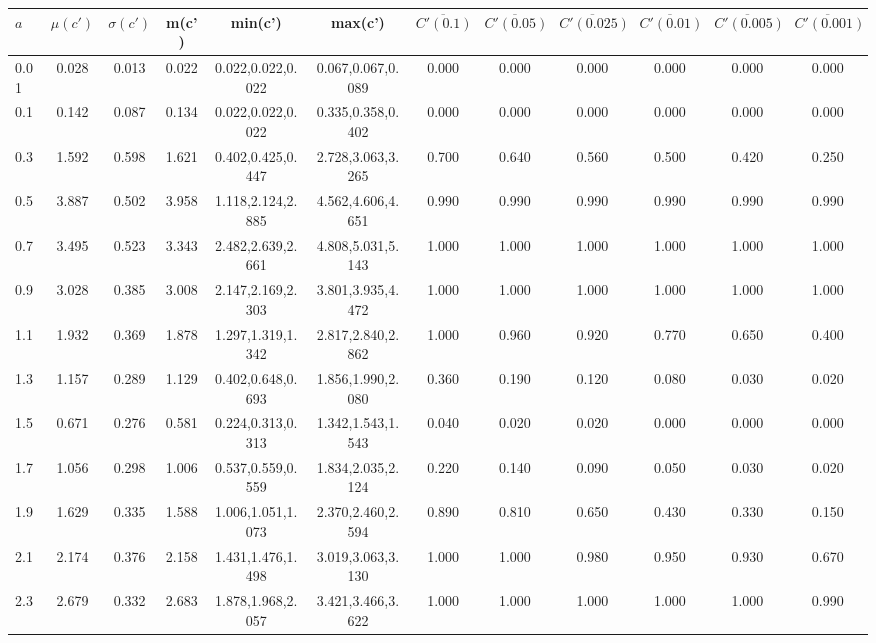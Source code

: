\begin{table*}[h!]
\begin{center}
\begin{tabular}{| l | c | c | c | c | c | c | c | c | c | c | c |}\hline
$a$ & $\mu(c')$ & $\sigma(c')$ & m(c') & min(c') & max(c') & $\overline{C'(0.1)}$ & $\overline{C'(0.05)}$ & $\overline{C'(0.025)}$ & $\overline{C'(0.01)}$ & $\overline{C'(0.005)}$ & $\overline{C'(0.001)}$ \\\hline
0.01 & 0.028 & 0.013 & 0.022 & 0.022,0.022,0.022 & 0.067,0.067,0.089  & 0.000  & 0.000  & 0.000  & 0.000  & 0.000  & 0.000 \\\hline
0.1 & 0.142 & 0.087 & 0.134 & 0.022,0.022,0.022 & 0.335,0.358,0.402  & 0.000  & 0.000  & 0.000  & 0.000  & 0.000  & 0.000 \\\hline
0.3 & 1.592 & 0.598 & 1.621 & 0.402,0.425,0.447 & 2.728,3.063,3.265  & 0.700  & 0.640  & 0.560  & 0.500  & 0.420  & 0.250 \\\hline
0.5 & 3.887 & 0.502 & 3.958 & 1.118,2.124,2.885 & 4.562,4.606,4.651  & 0.990  & 0.990  & 0.990  & 0.990  & 0.990  & 0.990 \\\hline
0.7 & 3.495 & 0.523 & 3.343 & 2.482,2.639,2.661 & 4.808,5.031,5.143  & 1.000  & 1.000  & 1.000  & 1.000  & 1.000  & 1.000 \\\hline
0.9 & 3.028 & 0.385 & 3.008 & 2.147,2.169,2.303 & 3.801,3.935,4.472  & 1.000  & 1.000  & 1.000  & 1.000  & 1.000  & 1.000 \\\hline
1.1 & 1.932 & 0.369 & 1.878 & 1.297,1.319,1.342 & 2.817,2.840,2.862  & 1.000  & 0.960  & 0.920  & 0.770  & 0.650  & 0.400 \\\hline
1.3 & 1.157 & 0.289 & 1.129 & 0.402,0.648,0.693 & 1.856,1.990,2.080  & 0.360  & 0.190  & 0.120  & 0.080  & 0.030  & 0.020 \\\hline
1.5 & 0.671 & 0.276 & 0.581 & 0.224,0.313,0.313 & 1.342,1.543,1.543  & 0.040  & 0.020  & 0.020  & 0.000  & 0.000  & 0.000 \\\hline
1.7 & 1.056 & 0.298 & 1.006 & 0.537,0.559,0.559 & 1.834,2.035,2.124  & 0.220  & 0.140  & 0.090  & 0.050  & 0.030  & 0.020 \\\hline
1.9 & 1.629 & 0.335 & 1.588 & 1.006,1.051,1.073 & 2.370,2.460,2.594  & 0.890  & 0.810  & 0.650  & 0.430  & 0.330  & 0.150 \\\hline
2.1 & 2.174 & 0.376 & 2.158 & 1.431,1.476,1.498 & 3.019,3.063,3.130  & 1.000  & 1.000  & 0.980  & 0.950  & 0.930  & 0.670 \\\hline
2.3 & 2.679 & 0.332 & 2.683 & 1.878,1.968,2.057 & 3.421,3.466,3.622  & 1.000  & 1.000  & 1.000  & 1.000  & 1.000  & 0.990 \\\hline

\end{tabular}
\end{center}
\end{table*}

